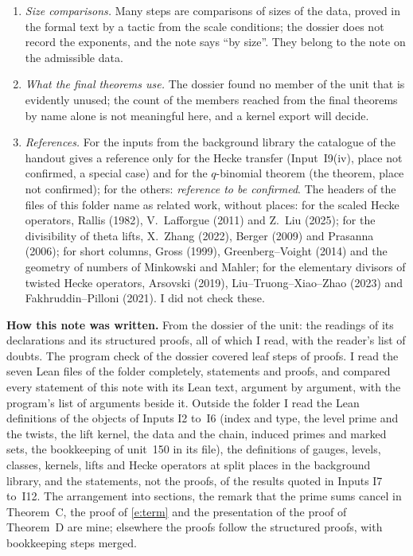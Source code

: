 \documentclass[11pt,a4paper]{article}
\newcommand{\subhead}[1]{\par\addvspace{9pt plus 2pt}\Needspace{4\baselineskip}\noindent\textbf{#1}\enspace\ignorespaces}
\theoremstyle{plainx}
\theoremstyle{uprightx}
\begin{document}
\begin{enumerate}[label=\textup{\arabic*.},leftmargin=1.6em,itemsep=5pt]
constant of Proposition~\ref{p:span}, the exponents of the diagonal point in Proposition~\ref{p:raise} (the
image at $\tau$ reads the component at the conjugate of the induced prime), and the denominator and the
scalar at the level prime (Lemma~\ref{l:lastcol}, Proposition~\ref{p:pairs}).
\item \emph{Size comparisons.} Many steps are comparisons of sizes of the data, proved in the formal text by a
tactic from the scale conditions; the dossier does not record the exponents, and the note says ``by size''.
They belong to the note on the admissible data.
\item \emph{What the final theorems use.} The dossier found no member of the unit that is evidently unused;
the count of the members reached from the final theorems by name alone is not meaningful here, and a kernel
export will decide.
\item \emph{References.} For the inputs from the background library the catalogue of the handout gives a
reference only for the Hecke transfer (Input~I9(iv), place not confirmed, a special case) and for the
$q$-binomial theorem (the theorem, place not confirmed); for the others: \emph{reference to be confirmed}. The
headers of the files of this folder name as related work, without places: for the scaled Hecke operators,
Rallis (1982), V.~Lafforgue (2011) and Z.~Liu (2025); for the divisibility of theta lifts, X.~Zhang (2022),
Berger (2009) and Prasanna (2006); for short columns, Gross (1999), Greenberg--Voight (2014) and the geometry of
numbers of Minkowski and Mahler; for the elementary divisors of twisted Hecke operators, Arsovski (2019),
Liu--Truong--Xiao--Zhao (2023) and Fakhruddin--Pilloni (2021). I did not check these.
\end{enumerate}

\subhead{How this note was written.} From the dossier of the unit: the readings of its \UnitMembers{}
declarations and its \UnitProofs{} structured proofs, all of which I read, with the reader's list of doubts. The
program check of the dossier covered \UnitSteps{} leaf steps of \UnitProofs{} proofs. I read the seven Lean
files of the folder completely, statements and proofs, and compared every statement of this note with its Lean
text, argument by argument, with the program's list of arguments beside it. Outside the folder I read the Lean
definitions of the objects of Inputs I2 to~I6 (index and type, the level prime and the twists, the lift kernel,
the data and the chain, induced primes and marked sets, the bookkeeping of unit~150 in its file), the
definitions of gauges, levels, classes, kernels, lifts and Hecke operators at split places in the background
library, and the statements, not the proofs, of the results quoted in Inputs I7 to~I12. The arrangement into
sections, the remark that the prime sums cancel in Theorem~C, the proof of \eqref{e:term} and the presentation
of the proof of Theorem~D are mine; elsewhere the proofs follow the structured proofs, with bookkeeping steps
merged.
\end{document}
